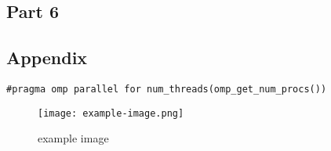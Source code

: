 \documentclass{article}
\begin{document}
\subsection*{Part 6}
\subsection*{Appendix}

\begin{lstlisting}[caption=example code]
    #pragma omp parallel for num_threads(omp_get_num_procs())
\end{lstlisting}

\begin{figure}[H]
    \centering
    \texttt{[image: example-image.png]} 
    \caption{example image}
    \label{fig:graph}
\end{figure}
\end{document}
